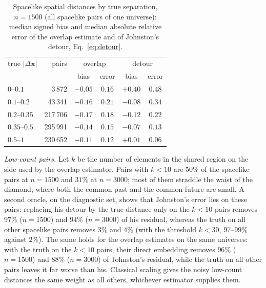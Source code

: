 \documentclass[prd,twocolumn,superscriptaddress,nofootinbib,amsmath,amssymb,floatfix]{revtex4-2}
\begin{document}
\begin{table}[t]
\caption{Spacelike spatial distances by true separation, $n=1500$ (all spacelike pairs of one universe): median signed bias and median absolute relative error of the overlap estimate and of Johnston's detour, Eq.~\eqref{eq:detour}.}
\label{tab:profile}
\begin{ruledtabular}
\begin{tabular}{lrcccc}
true $|\Delta\mathbf x|$ & pairs & \multicolumn{2}{c}{overlap} & \multicolumn{2}{c}{detour}\\
 & & bias & error & bias & error\\
\hline
$0$--$0.1$ & 3\,872 & $-0.05$ & $0.16$ & $+0.40$ & $0.48$\\
$0.1$--$0.2$ & 43\,341 & $-0.16$ & $0.21$ & $-0.08$ & $0.34$\\
$0.2$--$0.35$ & 217\,706 & $-0.17$ & $0.18$ & $-0.12$ & $0.22$\\
$0.35$--$0.5$ & 295\,991 & $-0.14$ & $0.15$ & $-0.07$ & $0.13$\\
$0.5$--$1$ & 230\,652 & $-0.11$ & $0.12$ & $+0.01$ & $0.06$\\
\end{tabular}
\end{ruledtabular}
\end{table}

\emph{Low-count pairs.} Let $k$ be the number of elements in the shared region on the side used by the overlap estimator. Pairs with $k<10$ are $50\%$ of the spacelike pairs at $n=1500$ and $31\%$ at $n=3000$; most of them straddle the waist of the diamond, where both the common past and the common future are small. A second oracle, on the diagnostic set, shows that Johnston's error lies on these pairs: replacing his detour by the true distance only on the $k<10$ pairs removes $97\%$ ($n=1500$) and $94\%$ ($n=3000$) of his residual, whereas the truth on all other spacelike pairs removes $3\%$ and $4\%$ (with the threshold $k<30$, $97$--$99\%$ against $2\%$). The same holds for the overlap estimates on the same universes: with the truth on the $k<10$ pairs, their direct embedding removes $96\%$ ($n=1500$) and $88\%$ ($n=3000$) of Johnston's residual, while the truth on all other pairs leaves it far worse than his. Classical scaling gives the noisy low-count distances the same weight as all others, whichever estimator supplies them.
\end{document}
